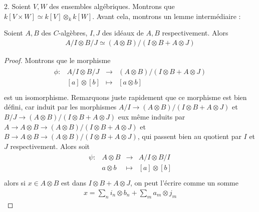         \begin{question}{2.}
            Soient $V,W$ des ensembles algébriques. Montrons que $k[V \times W] \simeq k[V] \otimes_k k[W]$. Avant cela, montrons un lemme intermédiaire :
            \begin{lemm}
                Soient $A,B$ des $C$-algèbres, $I,J$ des idéaux de $A,B$ respectivement. Alors
                \begin{align*}
                    A/I \otimes B/J \simeq (A \otimes B)/(I \otimes B + A \otimes J)
                \end{align*}
            \end{lemm}
            \begin{proof}
                Montrons que le morphisme
                \begin{align*}
                    \begin{array}{cccc}
                        \phi : & A/I \otimes B/J & \to & (A \otimes B)/(I \otimes B + A \otimes J) \\
                        & [a] \otimes [b] & \mapsto & [a \otimes b] \\
                    \end{array}
                \end{align*}
                est un isomorphisme. Remarquons juste rapidement que ce morphisme est bien défini, car induit par les morphismes $A/I \to (A \otimes B)/(I \otimes B + A \otimes J)$ et $B/J \to (A \otimes B)/(I \otimes B + A \otimes J)$ eux même induits par $A \to A \otimes B \to (A \otimes B)/(I \otimes B + A \otimes J)$ et $B \to A \otimes B \to (A \otimes B)/(I \otimes B + A \otimes J)$, qui passent bien au quotient par $I$ et $J$ respectivement. Alors soit
                \begin{align*}
                    \begin{array}{cccc}
                        \psi : & A \otimes B & \to & A/I \otimes B/I\\
                        & a \otimes b & \mapsto & [a] \otimes [b] \\
                    \end{array}
                \end{align*}
                alors si $x \in A \otimes B$ est dans $I \otimes B + A \otimes J$, on peut l'écrire comme un somme
                \begin{align*}
                    x = \sum_n i_n \otimes b_n + \sum_m a_m \otimes j_m
                \end{align*}

\end{proof}
\end{question}
